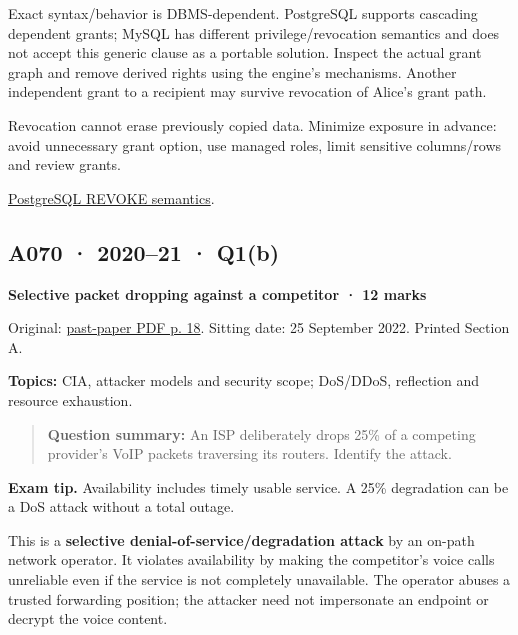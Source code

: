 \documentclass[11pt,a4paper]{article}
\begin{document}
Exact syntax/\allowbreak{}behavior is DBMS-dependent. PostgreSQL supports cascading dependent grants; MySQL has different privilege/\allowbreak{}revocation semantics and does not accept this generic clause as a portable solution. Inspect the actual grant graph and remove derived rights using the engine's mechanisms. Another independent grant to a recipient may survive revocation of Alice's grant path.


Revocation cannot erase previously copied data. Minimize exposure in advance: avoid unnecessary grant option,\allowbreak{} use managed roles,\allowbreak{} limit sensitive columns/\allowbreak{}rows and review grants.


\href{https://www.postgresql.org/docs/current/sql-revoke.html}{PostgreSQL REVOKE semantics}.




\clearpage
\subsection{A070 · 2020–21 · Q1(b)}\label{a070}

\textbf{Selective packet dropping against a competitor · 12 marks}


Original: \href{../../CSE405-Security_Merged.pdf\#page=18}{past-paper PDF p. 18}. Sitting date: 25 September 2022. Printed Section A.


\textbf{Topics:} CIA,\allowbreak{} attacker models and security scope; DoS/\allowbreak{}DDoS,\allowbreak{} reflection and resource exhaustion.



\begin{quote}\small

\textbf{Question summary:} An ISP deliberately drops 25\% of a competing provider’s VoIP packets traversing its routers. Identify the attack.



\end{quote}


{\color{ForestGreen}\textbf{Exam tip.} Availability includes timely usable service. A 25\% degradation can be a DoS attack without a total outage.}


This is a \textbf{selective denial-of-service/\allowbreak{}degradation attack} by an on-path network operator. It violates availability by making the competitor's voice calls unreliable even if the service is not completely unavailable. The operator abuses a trusted forwarding position; the attacker need not impersonate an endpoint or decrypt the voice content.
\end{document}
